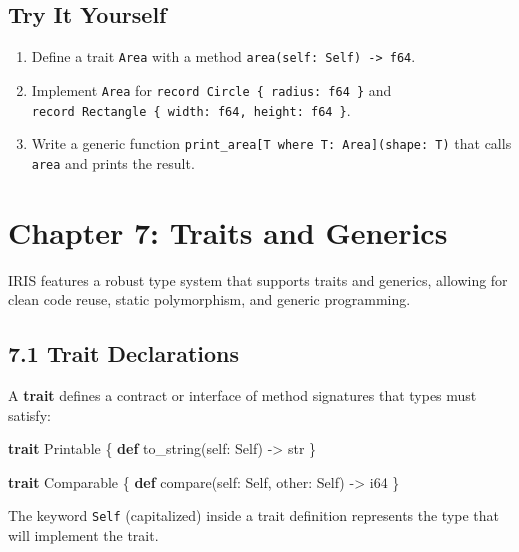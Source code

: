 \documentclass[
  english,
]{book}
\newenvironment{Shaded}{\begin{snugshade}}{\end{snugshade}}
\newcommand{\DataTypeTok}[1]{\textcolor[rgb]{0.31,0.79,0.69}{#1}}
\newcommand{\KeywordTok}[1]{\textcolor[rgb]{0.34,0.61,0.84}{\textbf{#1}}}
\newcommand{\NormalTok}[1]{\textcolor[rgb]{0.83,0.83,0.83}{#1}}
\newcommand{\OperatorTok}[1]{\textcolor[rgb]{0.83,0.83,0.83}{#1}}
\providecommand{\tightlist}{%
  \setlength{\itemsep}{0pt}\setlength{\parskip}{0pt}}
\begin{document}
\subsection{Try It Yourself}\label{try-it-yourself-5}

\begin{enumerate}
\def\labelenumi{\arabic{enumi}.}
\tightlist
\item
  Define a trait \texttt{Area} with a method
  \texttt{area(self:\ Self)\ -\textgreater{}\ f64}.
\item
  Implement \texttt{Area} for
  \texttt{record\ Circle\ \{\ radius:\ f64\ \}} and
  \texttt{record\ Rectangle\ \{\ width:\ f64,\ height:\ f64\ \}}.
\item
  Write a generic function
  \texttt{print\_area{[}T\ where\ T:\ Area{]}(shape:\ T)} that calls
  \texttt{area} and prints the result.
\end{enumerate}

\section{Chapter 7: Traits and
Generics}\label{chapter-7-traits-and-generics}

IRIS features a robust type system that supports traits and generics,
allowing for clean code reuse, static polymorphism, and generic
programming.

\subsection{7.1 Trait Declarations}\label{trait-declarations-1}

A \textbf{trait} defines a contract or interface of method signatures
that types must satisfy:

\begin{Shaded}
\begin{Highlighting}[]
\KeywordTok{trait}\NormalTok{ Printable \{}
    \KeywordTok{def}\NormalTok{ to\_string(self: Self) }\OperatorTok{{-}\textgreater{}} \DataTypeTok{str}
\NormalTok{\}}

\KeywordTok{trait}\NormalTok{ Comparable \{}
    \KeywordTok{def}\NormalTok{ compare(self: Self, other: Self) }\OperatorTok{{-}\textgreater{}} \DataTypeTok{i64}
\NormalTok{\}}
\end{Highlighting}
\end{Shaded}

The keyword \texttt{Self} (capitalized) inside a trait definition
represents the type that will implement the trait.
\end{document}
